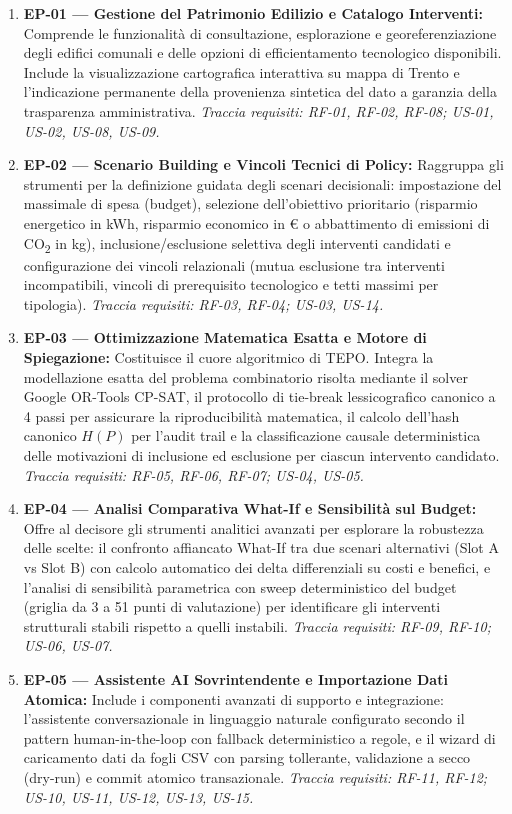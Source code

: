 \begin{enumerate}[leftmargin=1.8em, itemsep=0.4em]
    \item \textbf{EP-01 --- Gestione del Patrimonio Edilizio e Catalogo Interventi:}
    Comprende le funzionalità di consultazione, esplorazione e georeferenziazione degli edifici comunali e delle opzioni di efficientamento tecnologico disponibili. Include la visualizzazione cartografica interattiva su mappa di Trento e l'indicazione permanente della provenienza sintetica del dato a garanzia della trasparenza amministrativa.
    \emph{Traccia requisiti: RF-01, RF-02, RF-08; US-01, US-02, US-08, US-09.}

    \item \textbf{EP-02 --- Scenario Building e Vincoli Tecnici di Policy:}
    Raggruppa gli strumenti per la definizione guidata degli scenari decisionali: impostazione del massimale di spesa (budget), selezione dell'obiettivo prioritario (risparmio energetico in kWh, risparmio economico in \euro{} o abbattimento di emissioni di CO\textsubscript{2} in kg), inclusione/esclusione selettiva degli interventi candidati e configurazione dei vincoli relazionali (mutua esclusione tra interventi incompatibili, vincoli di prerequisito tecnologico e tetti massimi per tipologia).
    \emph{Traccia requisiti: RF-03, RF-04; US-03, US-14.}

    \item \textbf{EP-03 --- Ottimizzazione Matematica Esatta e Motore di Spiegazione:}
    Costituisce il cuore algoritmico di TEPO. Integra la modellazione esatta del problema combinatorio risolta mediante il solver Google OR-Tools CP-SAT, il protocollo di tie-break lessicografico canonico a 4 passi per assicurare la riproducibilità matematica, il calcolo dell'hash canonico $H(P)$ per l'audit trail e la classificazione causale deterministica delle motivazioni di inclusione ed esclusione per ciascun intervento candidato.
    \emph{Traccia requisiti: RF-05, RF-06, RF-07; US-04, US-05.}

    \item \textbf{EP-04 --- Analisi Comparativa What-If e Sensibilità sul Budget:}
    Offre al decisore gli strumenti analitici avanzati per esplorare la robustezza delle scelte: il confronto affiancato What-If tra due scenari alternativi (Slot A vs Slot B) con calcolo automatico dei delta differenziali su costi e benefici, e l'analisi di sensibilità parametrica con sweep deterministico del budget (griglia da 3 a 51 punti di valutazione) per identificare gli interventi strutturali stabili rispetto a quelli instabili.
    \emph{Traccia requisiti: RF-09, RF-10; US-06, US-07.}

    \item \textbf{EP-05 --- Assistente AI Sovrintendente e Importazione Dati Atomica:}
    Include i componenti avanzati di supporto e integrazione: l'assistente conversazionale in linguaggio naturale configurato secondo il pattern human-in-the-loop con fallback deterministico a regole, e il wizard di caricamento dati da fogli CSV con parsing tollerante, validazione a secco (dry-run) e commit atomico transazionale.
    \emph{Traccia requisiti: RF-11, RF-12; US-10, US-11, US-12, US-13, US-15.}
\end{enumerate}

